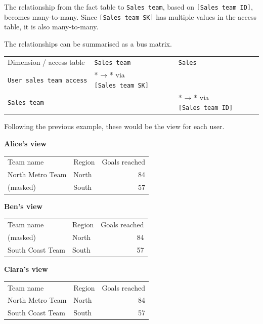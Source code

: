 \documentclass[10pt,openany,10pt]{book}
\newcounter{none}
\let\podeToprule\toprule
\let\podeMidrule\midrule
\let\podeBottomrule\bottomrule
\renewcommand{\toprule}{\arrayrulecolor{pbiGrid}\podeToprule}
\renewcommand{\midrule}{\arrayrulecolor{pbiGrid}\podeMidrule}
\renewcommand{\bottomrule}{\arrayrulecolor{pbiGrid}\podeBottomrule}
\begin{document}
The relationship from the fact table to
\texttt{\textquotesingle{}Sales\ team\textquotesingle{}}, based on
\texttt{{[}Sales\ team\ ID{]}}, becomes many-to-many. Since
\texttt{{[}Sales\ team\ SK{]}} has multiple values in the access table,
it is also many-to-many.

The relationships can be summarised as a bus matrix.

{\def\LTcaptype{none} %
\begin{longtable}[]{@{}lll@{}}
\toprule\noalign{}
Dimension / access table &
\texttt{\textquotesingle{}Sales\ team\textquotesingle{}} &
\texttt{\textquotesingle{}Sales\textquotesingle{}} \\
\midrule\noalign{}
\endhead
\bottomrule\noalign{}
\endlastfoot
\texttt{\textquotesingle{}User\ sales\ team\ access\textquotesingle{}} &
* → * via \texttt{{[}Sales\ team\ SK{]}} & \\
\texttt{\textquotesingle{}Sales\ team\textquotesingle{}} & & * → * via
\texttt{{[}Sales\ team\ ID{]}} \\
\end{longtable}
}

Following the previous example, these would be the view for each user.

\textbf{Alice's view}

{\def\LTcaptype{none} %
\begin{longtable}[]{@{}llr@{}}
\toprule\noalign{}
Team name & Region & Goals reached \\
\midrule\noalign{}
\endhead
\bottomrule\noalign{}
\endlastfoot
North Metro Team & North & 84 \\
(masked) & South & 57 \\
\end{longtable}
}

\textbf{Ben's view}

{\def\LTcaptype{none} %
\begin{longtable}[]{@{}llr@{}}
\toprule\noalign{}
Team name & Region & Goals reached \\
\midrule\noalign{}
\endhead
\bottomrule\noalign{}
\endlastfoot
(masked) & North & 84 \\
South Coast Team & South & 57 \\
\end{longtable}
}

\textbf{Clara's view}

{\def\LTcaptype{none} %
\begin{longtable}[]{@{}llr@{}}
\toprule\noalign{}
Team name & Region & Goals reached \\
\midrule\noalign{}
\endhead
\bottomrule\noalign{}
\endlastfoot
North Metro Team & North & 84 \\
South Coast Team & South & 57 \\
\end{longtable}
}
\end{document}
